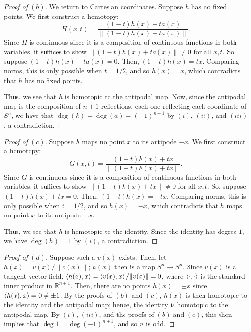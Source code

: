 \documentclass[12pt]{article}
\theoremstyle{remark}
\begin{document}
\begin{proof}[Proof of $(b)$]
  We return to Cartesian coordinates. Suppose $h$ has no fixed points. We first construct a homotopy:
  \begin{equation*}
    H(x,t) = \frac{(1-t)h(x)+ta(x)}{\lVert(1-t)h(x)+ta(x)\rVert}.
  \end{equation*}
  Since $H$ is continuous since it is a composition of continuous functions in both variables, it suffices to show $\lVert(1-t)h(x)+ta(x)\rVert \ne 0$ for all $x,t$. So, suppose $(1-t)h(x)+ta(x) = 0$. Then, $(1-t)h(x) = tx$. Comparing norms, this is only possible when $t=1/2$, and so $h(x) = x$, which contradicts that $h$ has no fixed points.
  \par Thus, we see that $h$ is homotopic to the antipodal map. Now, since the antipodal map is the composition of $n+1$ reflections, each one reflecting each coordinate of $S^n$, we have that $\deg(h) = \deg(a) = (-1)^{n+1}$ by $(i)$, $(ii)$, and $(iii)$, a contradiction.
\end{proof}
\begin{proof}[Proof of $(c)$]
  Suppose $h$ maps no point $x$ to its antipode $-x$. We first construct a homotopy:
  \begin{equation*}
    G(x,t) = \frac{(1-t)h(x)+tx}{\lVert(1-t)h(x)+tx\rVert}.
  \end{equation*}
  Since $G$ is continuous since it is a composition of continuous functions in both variables, it suffices to show $\lVert(1-t)h(x)+tx\rVert \ne 0$ for all $x,t$. So, suppose $(1-t)h(x)+tx = 0$. Then, $(1-t)h(x) = -tx$. Comparing norms, this is only possible when $t=1/2$, and so $h(x) = -x$, which contradicts that $h$ maps no point $x$ to its antipode $-x$.
  \par Thus, we see that $h$ is homotopic to the identity. Since the identity has degree $1$, we have $\deg(h) = 1$ by $(i)$, a contradiction.
\end{proof}
\begin{proof}[Proof of $(d)$]
  Suppose such a $v(x)$ exists. Then, let $h(x) = v(x)/\lVert v(x) \rVert$; $h(x)$ then is a map $S^n \to S^n$. Since $v(x)$ is a tangent vector field, $\braket{h(x),x} = \braket{v(x),x}/\lVert v(x) \rVert = 0$, where $\braket{\cdot,\cdot}$ is the standard inner product in $\mathbb{R}^{n+1}$. Then, there are no points $h(x) = \pm x$ since $\braket{h(x),x} = 0 \ne \pm1$. By the proofs of $(b)$ and $(c)$, $h(x)$ is then homotopic to the identity and the antipodal map; hence, the identity is homotopic to the antipodal map. By $(i)$, $(iii)$, and the proofs of $(b)$ and $(c)$, this then implies that $\deg 1 = \deg (-1)^{n+1}$, and so $n$ is odd.
\end{proof}
\end{document}
